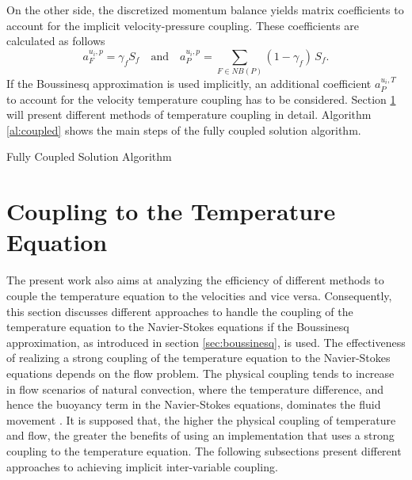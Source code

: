 On the other side, the discretized momentum balance yields matrix coefficients to account for the implicit velocity-pressure coupling. These coefficients are calculated as follows
\begin{displaymath}
  a_F^{u_i,p} =  \gamma_f S_f \quad \text{and} \quad a_P^{u_i,p} = \sum_{F \in NB(P)} (1-\gamma_f) \, S_f.
\end{displaymath}
If the Boussinesq approximation is used implicitly, an additional coefficient \(a_P^{u_i,T}\) to account for the velocity temperature coupling has to be considered. Section \ref{sec:temperaturecoupling} will present different methods of temperature coupling in detail. Algorithm \ref{al:coupled} shows the main steps of the fully coupled solution algorithm.

\begin{algorithm}
\label{al:coupled}
\caption{Fully Coupled Solution Algorithm}
\begin{algorithmic}
\Else
\EndIf
{}
\EndIf
\EndWhile
{}
\EndIf
\end{algorithmic}
\end{algorithm}

\section{Coupling to the Temperature Equation}
\label{sec:temperaturecoupling}

The present work also aims at analyzing the efficiency of different methods to couple the temperature equation to the velocities and vice versa. Consequently, this section discusses different approaches to handle the coupling of the temperature equation to the Navier-Stokes equations if the Boussinesq approximation, as introduced in section \ref{sec:boussinesq}, is used. The effectiveness of realizing a strong coupling of the temperature equation to the Navier-Stokes equations depends on the flow problem. The physical coupling tends to increase in flow scenarios of natural convection, where the temperature difference, and hence the buoyancy term in the Navier-Stokes equations, dominates the fluid movement \cite{ferziger02,vakilipour12}. It is supposed that, the higher the physical coupling of temperature and flow, the greater the benefits of using an implementation that uses a strong coupling to the temperature equation. The following subsections present different approaches to achieving implicit inter-variable coupling.
      
